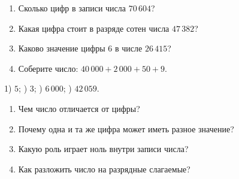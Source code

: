 \begin{practicebox}
  \begin{enumerate}
    \item Сколько цифр в записи числа \(70\,604\)?
    \item Какая цифра стоит в разряде сотен числа \(47\,382\)?
    \item Каково значение цифры \(6\) в числе \(26\,415\)?
    \item Соберите число: \(40\,000+2\,000+50+9\).
  \end{enumerate}
\end{practicebox}

\begin{notebox}[Ответы]
  1) \(5\); ) \(3\); ) \(6\,000\); ) \(42\,059\).
\end{notebox}

\begin{questionsbox}
  \begin{enumerate}
    \item Чем число отличается от цифры?
    \item Почему одна и та же цифра может иметь разное значение?
    \item Какую роль играет ноль внутри записи числа?
    \item Как разложить число на разрядные слагаемые?
  \end{enumerate}
\end{questionsbox}
